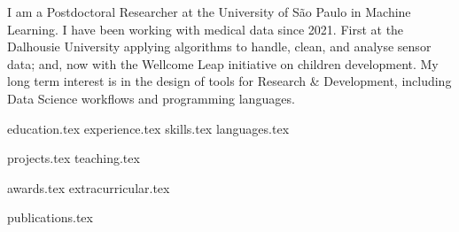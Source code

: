 \documentclass[letterpaper,11pt]{article}
\begin{document}
\newpage


\vspace{0.35cm}
{\justifying
I am a Postdoctoral Researcher at the University of São Paulo in Machine Learning.
I have been working with medical data since 2021.
First at the Dalhousie University applying algorithms to handle, clean, and analyse sensor data; and, now with the
Wellcome Leap initiative on children development. %
My long term interest is in the design of tools for Research \& Development, including 
Data Science workflows and programming languages. %


}

{education.tex}
{experience.tex}
\newpage
\sidebyside
    {{skills.tex}}
    {{languages.tex}}


{projects.tex}
{teaching.tex}

{awards.tex}
{extracurricular.tex}


{publications.tex}
\end{document}
